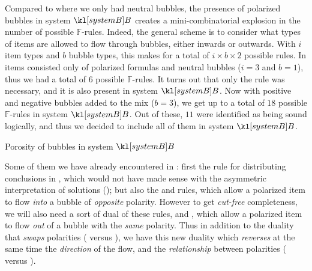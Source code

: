 \begin{description}
  Compared to  where we only had neutral bubbles, the presence of
  polarized bubbles in system $\sysB$ creates a mini-combinatorial explosion in
  the number of possible $\mathbb{F}$-rules. Indeed, the general scheme is to
  consider what types of items are allowed to flow through bubbles, either
  inwards or outwards. With $i$ item types and $b$ bubble types, this makes for
  a total of $i \times b \times 2$ possible rules. In  items consisted
  only of polarized formulas and neutral bubbles ($i = 3$ and $b = 1$), thus we
  had a total of $6$ possible $\mathbb{F}$-rules. It turns out that only the
   rule was necessary, and it is also present in system
  $\sysB$. Now with positive and negative bubbles added to the mix ($b = 3$), we
  get up to a total of $18$ possible $\mathbb{F}$-rules in system $\sysB$. Out
  of these, $11$ were identified as being sound logically, and thus we decided
  to include all of them in system $\sysB$.

  \begin{marginfigure}
    \caption{Porosity of bubbles in system $\sysB$}
  \end{marginfigure}
  
  Some of them we have already encountered in : first the
   rule for distributing conclusions in , which
  would not have made sense with the asymmetric interpretation of solutions
  (); but also the  and
   rules, which allow a polarized item to flow
  \emph{into} a bubble of \emph{opposite} polarity. However to get
  \emph{cut-free} completeness, we will also need a sort of dual of these rules,
   and , which allow a polarized
  item to flow \emph{out} of a bubble with the \emph{same} polarity. Thus in
  addition to the duality that \emph{swaps} polarities
  ( versus ), we have this new
  duality which \emph{reverses} at the same time the \emph{direction} of the
  flow, and the \emph{relationship} between polarities
  ( versus ).


\end{description}
